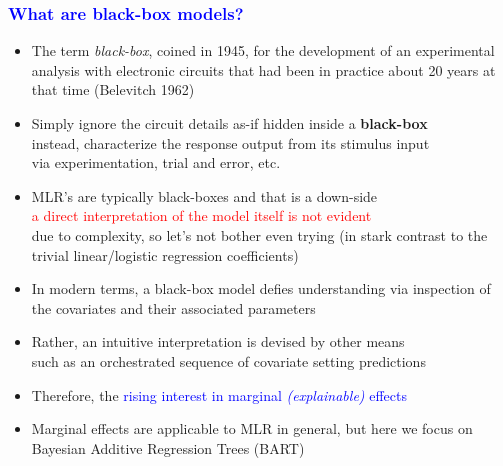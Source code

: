 \documentclass[11pt,dvipsnames,usenames,times]{beamer}
\newcommand*{\red}[1]{\textcolor{red}{#1}}%
\newcommand*{\blue}[1]{\textcolor{blue}{#1}}%
\begin{document}
\begin{frame}
\frametitle{\bf\textcolor{blue}{What are black-box models?}}
\boldmath

\begin{itemize}
\item The term {\it black-box}, coined in 1945, for the development of
  an experimental analysis with electronic circuits that had been in
  practice about 20 years at that time (Belevitch 1962)
\item Simply ignore the circuit details as-if hidden inside a {\bf black-box}\\
  instead, characterize the response output from %
  its stimulus input\\
  via experimentation, trial and error, etc.
\item MLR's are typically black-boxes and that is a down-side\\
\red{a direct interpretation of the model itself is not evident} \\
due to complexity, so let's not bother even trying 
(in stark contrast to the trivial linear/logistic regression coefficients)
\item In modern terms, a black-box model defies
understanding via inspection of the covariates
and their associated parameters
\item Rather, an intuitive interpretation is devised by other means\\ 
such as an orchestrated sequence of covariate setting predictions
\item Therefore, the \blue{rising interest in marginal {\it
      (explainable)} effects}
\item Marginal effects are applicable to MLR in general, but here we
 focus on Bayesian Additive Regression Trees (BART) 
\end{itemize}
\end{frame}
\end{document}
